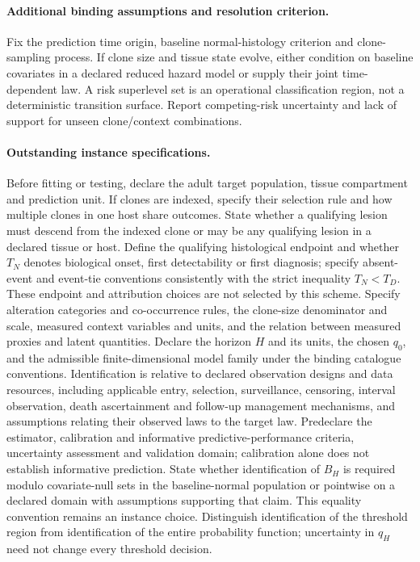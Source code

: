 \documentclass[11pt]{article}
\begin{document}
\paragraph{Additional binding assumptions and resolution criterion.} Fix the prediction time origin, baseline normal-histology criterion and clone-sampling process. If clone size and tissue state evolve, either condition on baseline covariates in a declared reduced hazard model or supply their joint time-dependent law. A risk superlevel set is an operational classification region, not a deterministic transition surface. Report competing-risk uncertainty and lack of support for unseen clone/context combinations.
\paragraph{Outstanding instance specifications.} Before fitting or testing, declare the adult target population, tissue compartment and prediction unit. If clones are indexed, specify their selection rule and how multiple clones in one host share outcomes. State whether a qualifying lesion must descend from the indexed clone or may be any qualifying lesion in a declared tissue or host. Define the qualifying histological endpoint and whether $T_N$ denotes biological onset, first detectability or first diagnosis; specify absent-event and event-tie conventions consistently with the strict inequality $T_N<T_D$. These endpoint and attribution choices are not selected by this scheme. Specify alteration categories and co-occurrence rules, the clone-size denominator and scale, measured context variables and units, and the relation between measured proxies and latent quantities. Declare the horizon $H$ and its units, the chosen $q_0$, and the admissible finite-dimensional model family under the binding catalogue conventions. Identification is relative to declared observation designs and data resources, including applicable entry, selection, surveillance, censoring, interval observation, death ascertainment and follow-up management mechanisms, and assumptions relating their observed laws to the target law. Predeclare the estimator, calibration and informative predictive-performance criteria, uncertainty assessment and validation domain; calibration alone does not establish informative prediction. State whether identification of $B_H$ is required modulo covariate-null sets in the baseline-normal population or pointwise on a declared domain with assumptions supporting that claim. This equality convention remains an instance choice. Distinguish identification of the threshold region from identification of the entire probability function; uncertainty in $q_H$ need not change every threshold decision.
\end{document}
